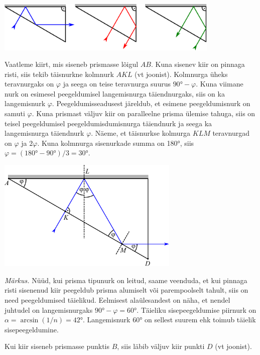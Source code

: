 \begin{center}
 \includegraphics[width=0.8\textwidth]{2014-v3g-04-periskoopprillid_lahendus_joonis1.pdf}
\end{center}

\osa Vaatleme kiirt, mis siseneb prismasse lõigul $AB$. Kuna sisenev kiir on pinnaga risti, siis tekib täisnurkne kolmnurk $AKL$ (vt joonist). Kolmnurga üheks teravnurgaks on $\varphi$ ja seega on teise teravnurga suurus $\ang{90}-\varphi$. Kuna viimane nurk on esimesel peegeldumisel langemisnurga täiendnurgaks, siis on ka langemisnurk $\varphi$. Peegeldumisseadusest järeldub, et esimene peegeldumisnurk on samuti $\varphi$. Kuna prismast väljuv kiir on paralleelne prisma ülemise tahuga, siis on teisel peegeldumisel peegeldumisdumisnurga täiendnurk ja seega ka langemisnurga täiendnurk $\varphi$. Näeme, et täisnurkse kolmurga $KLM$ teravnurgad on $\varphi$ ja $2\varphi$. Kuna kolmnurga sisenurkade summa on \ang{180}, siis $\varphi=(\ang{180}-\ang{90})/3=\ang{30}$.

\begin{center}
 \includegraphics[width=0.65\textwidth]{2014-v3g-04-periskoopprillid_lahendus_joonis2.pdf}
\end{center}

\emph{Märkus.} Nüüd, kui prisma tipunurk on leitud, saame veenduda, et kui pinnaga risti sisenenud kiir peegeldub prisma alumiselt või parempoolselt tahult, siis on need peegeldumised täielikud. Eelmisest alaülesandest on näha, et nendel juhtudel on langemisnurgaks $\ang{90}-\varphi=\ang{60}$. Täieliku sisepeegeldumise piirnurk on $\alpha=\arcsin(1/n)=\ang{42}$. Langemisnurk \ang{60} on sellest suurem ehk toimub täielik sisepeegeldumine.

\osa Kui kiir siseneb prismasse punktis $B$, siis läbib väljuv kiir punkti $D$ (vt joonist).

